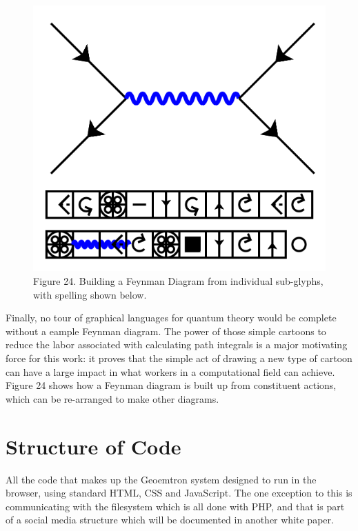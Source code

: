 \documentclass[11pt]{article}
\begin{document}
\begin{figure}

\includegraphics[width=\linewidth]{figures/figure24_feynman1.png}

\caption{Figure 24. Building a Feynman Diagram from individual sub-glyphs, with spelling shown below.}
\end{figure}




    Finally, no tour of graphical languages for quantum theory would be complete without a eample Feynman diagram.  The power of those simple cartoons to reduce the labor associated with calculating path integrals is a major motivating force for this work: it proves that the simple act of drawing a new type of cartoon can have a large impact in what workers in a computational field can achieve.  Figure 24 shows how a Feynman diagram is built up from constituent actions, which can be re-arranged to make other diagrams. 

\section{Structure of Code}


    All the code that makes up the Geoemtron system designed to run in the browser, using standard HTML, CSS and JavaScript.  The one exception to this is communicating with the filesystem which is all done with PHP, and that is part of a social media structure which will be documented in another white paper.  
\end{document}
